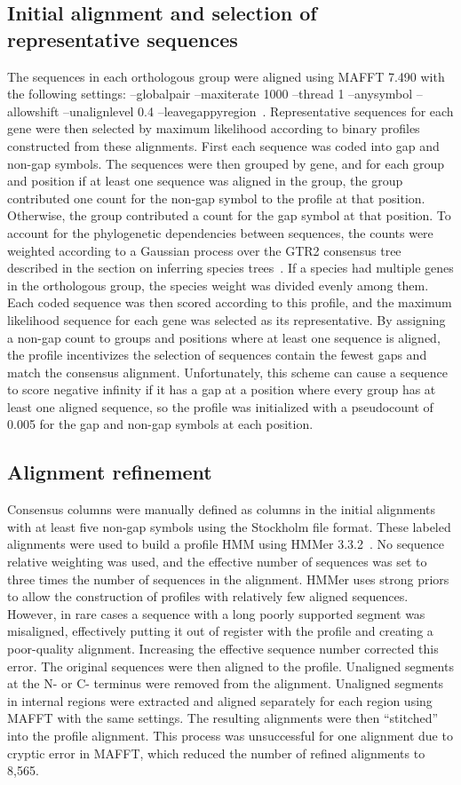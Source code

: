 \documentclass[10pt,letterpaper]{article}
\begin{document}
\subsection*{Initial alignment and selection of representative sequences}
The sequences in each orthologous group were aligned using MAFFT 7.490 with the following settings: --globalpair --maxiterate 1000 --thread 1 --anysymbol --allowshift --unalignlevel 0.4 --leavegappyregion~\cite{Katoh2013}. Representative sequences for each gene were then selected by maximum likelihood according to binary profiles constructed from these alignments. First each sequence was coded into gap and non-gap symbols. The sequences were then grouped by gene, and for each group and position if at least one sequence was aligned in the group, the group contributed one count for the non-gap symbol to the profile at that position. Otherwise, the group contributed a count for the gap symbol at that position. To account for the phylogenetic dependencies between sequences, the counts were weighted according to a Gaussian process over the GTR2 consensus tree described in the section on inferring species trees~\cite{Altschul1989}. If a species had multiple genes in the orthologous group, the species weight was divided evenly among them. Each coded sequence was then scored according to this profile, and the maximum likelihood sequence for each gene was selected as its representative. By assigning a non-gap count to groups and positions where at least one sequence is aligned, the profile incentivizes the selection of sequences contain the fewest gaps and match the consensus alignment. Unfortunately, this scheme can cause a sequence to score negative infinity if it has a gap at a position where every group has at least one aligned sequence, so the profile was initialized with a pseudocount of 0.005 for the gap and non-gap symbols at each position.

\subsection*{Alignment refinement}
Consensus columns were manually defined as columns in the initial alignments with at least five non-gap symbols using the Stockholm file format. These labeled alignments were used to build a profile HMM using HMMer 3.3.2~\cite{Eddy2009}. No sequence relative weighting was used, and the effective number of sequences was set to three times the number of sequences in the alignment. HMMer uses strong priors to allow the construction of profiles with relatively few aligned sequences. However, in rare cases a sequence with a long poorly supported segment was misaligned, effectively putting it out of register with the profile and creating a poor-quality alignment. Increasing the effective sequence number corrected this error. The original sequences were then aligned to the profile. Unaligned segments at the N- or C- terminus were removed from the alignment. Unaligned segments in internal regions were extracted and aligned separately for each region using MAFFT with the same settings. The resulting alignments were then “stitched” into the profile alignment. This process was unsuccessful for one alignment due to cryptic error in MAFFT, which reduced the number of refined alignments to 8,565.
\end{document}
